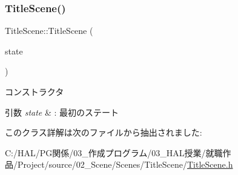 \subsubsection{\texorpdfstring{Title\+Scene()}{TitleScene()}}
{\footnotesize\ttfamily Title\+Scene\+::\+Title\+Scene (\begin{DoxyParamCaption}\item[{\mbox{\hyperlink{class_scene_bace_1_1_state_abstract}{State\+Abstract}} $\ast$}]{state }\end{DoxyParamCaption})\hspace{0.3cm}{\ttfamily [inline]}}



コンストラクタ 


\begin{DoxyParams}{引数}
{\em state} & \+: 最初のステート \\
\hline
\end{DoxyParams}


このクラス詳解は次のファイルから抽出されました\+:\begin{DoxyCompactItemize}
\item 
C\+:/\+H\+A\+L/\+P\+G関係/03\+\_\+作成プログラム/03\+\_\+\+H\+A\+L授業/就職作品/\+Project/source/02\+\_\+\+Scene/\+Scenes/\+Title\+Scene/\mbox{\hyperlink{_title_scene_8h}{Title\+Scene.\+h}}\end{DoxyCompactItemize}
